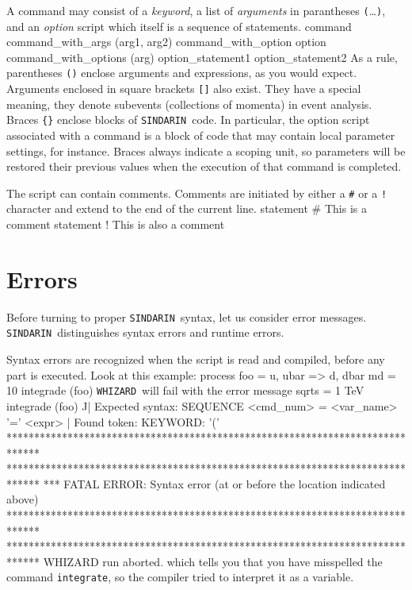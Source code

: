 \documentclass[12pt]{book}
\newenvironment{interaction}%
  {\begingroup\small
   \Verbatim}%
  {\endVerbatim
   \endgroup\noindent}
\newenvironment{code}%
  {\begingroup\footnotesize
   \quote
   \Verbatim}%
  {\endVerbatim
   \endquote
   \endgroup\noindent}
\newcommand{\ttt}[1]{\texttt{#1}}
\newcommand{\whizard}{\ttt{WHIZARD}}
\newcommand{\sindarin}{\ttt{SINDARIN}}
\begin{document}
A command may consist of a \emph{keyword}, a list of \emph{arguments} in
parantheses \ttt{(}\ldots\ttt{)}, and an \emph{option} script which
itself is a sequence of statements.
\begin{code}
command
command_with_args (arg1, arg2)
command_with_option { option }
command_with_options (arg) {
  option_statement1
  option_statement2
}
\end{code}
As a rule, parentheses \ttt{()} enclose arguments and expressions, as
you would expect.  Arguments enclosed in square brackets \ttt{[]} also
exist.  They have a special meaning, they denote subevents
(collections of momenta) in event analysis.  Braces \ttt{\{\}} enclose
blocks of \sindarin\ code.  In particular, the option script
associated with a command is a block of code that may contain local
parameter settings, for instance.  Braces always indicate a scoping
unit, so parameters will be restored their previous values when the
execution of that command is completed.

The script can contain comments.   Comments are initiated by either a \verb|#|
or a \verb|!| character and extend to the end of the current line.
\begin{code}
statement
# This is a comment
statement  ! This is also a comment
\end{code}



\section{Errors}
\label{sec:errors}

Before turning to proper \sindarin\ syntax, let us consider error messages.
\sindarin\ distinguishes syntax errors and runtime errors.

Syntax errors are recognized when the script is read and compiled,
before any part is executed.  Look at this example:
\begin{code}
process foo = u, ubar => d, dbar
md = 10
integrade (foo)
\end{code}
\whizard\ will fail with the error message
\begin{interaction}
sqrts = 1 TeV
integrade (foo)
          ^^
| Expected syntax: SEQUENCE    <cmd_num> = <var_name> '=' <expr>
| Found token: KEYWORD:    '('
******************************************************************************
******************************************************************************
*** FATAL ERROR:  Syntax error (at or before the location indicated above)
******************************************************************************
******************************************************************************
WHIZARD run aborted.
\end{interaction}
which tells you that you have misspelled the command
\verb|integrate|, so the compiler tried to interpret it as a variable.
\end{document}
